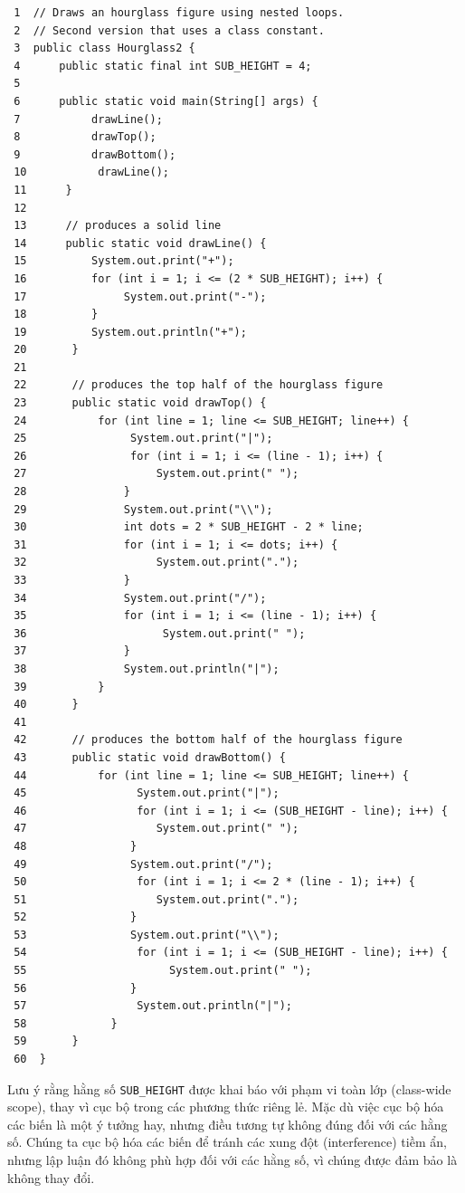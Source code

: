 \begin{verbatim}
 1  // Draws an hourglass figure using nested loops.
 2  // Second version that uses a class constant.
 3  public class Hourglass2 {
 4      public static final int SUB_HEIGHT = 4;
 5
 6      public static void main(String[] args) {
 7           drawLine();
 8           drawTop();
 9           drawBottom();
 10           drawLine();
 11      }
 12
 13      // produces a solid line
 14      public static void drawLine() {
 15          System.out.print("+");
 16          for (int i = 1; i <= (2 * SUB_HEIGHT); i++) {
 17               System.out.print("-");
 18          }
 19          System.out.println("+");
 20       }
 21
 22       // produces the top half of the hourglass figure
 23       public static void drawTop() {
 24           for (int line = 1; line <= SUB_HEIGHT; line++) {
 25                System.out.print("|");
 26                for (int i = 1; i <= (line - 1); i++) {
 27                    System.out.print(" ");
 28               }
 29               System.out.print("\\");
 30               int dots = 2 * SUB_HEIGHT - 2 * line;
 31               for (int i = 1; i <= dots; i++) {
 32                    System.out.print(".");
 33               }
 34               System.out.print("/");
 35               for (int i = 1; i <= (line - 1); i++) {
 36                     System.out.print(" ");
 37               }
 38               System.out.println("|");
 39           }
 40       }
 41
 42       // produces the bottom half of the hourglass figure
 43       public static void drawBottom() {
 44           for (int line = 1; line <= SUB_HEIGHT; line++) {
 45                 System.out.print("|");
 46                 for (int i = 1; i <= (SUB_HEIGHT - line); i++) {
 47                    System.out.print(" ");
 48                }
 49                System.out.print("/");
 50                 for (int i = 1; i <= 2 * (line - 1); i++) {
 51                    System.out.print(".");
 52                }
 53                System.out.print("\\");
 54                 for (int i = 1; i <= (SUB_HEIGHT - line); i++) {
 55                      System.out.print(" ");
 56                }
 57                 System.out.println("|");
 58             }
 59       }
 60  }
\end{verbatim}

Lưu ý rằng hằng số \texttt{SUB\_HEIGHT} được khai báo với phạm vi toàn
lớp (class-wide scope), thay vì cục bộ trong các phương thức riêng lẻ.
Mặc dù việc cục bộ hóa các biến là một ý tưởng hay, nhưng điều tương tự
không đúng đối với các hằng số. Chúng ta cục bộ hóa các biến để tránh
các xung đột (interference) tiềm ẩn, nhưng lập luận đó không phù hợp đối
với các hằng số, vì chúng được đảm bảo là không thay đổi.

